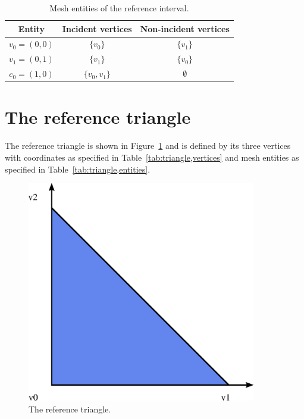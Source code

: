 \begin{table}[H]
\linespread{1.2}\selectfont
  \begin{center}
    \begin{tabular}{|c|c|c|}
      \hline
      Entity & Incident vertices & Non-incident vertices \\
      \hline
      \hline
      $v_0 = (0, 0)$ & $\{v_0\}$ & $\{v_1\}$ \\
      \hline
      $v_1 = (0, 1)$ & $\{v_1\}$ & $\{v_0\}$ \\
      \hline
      $c_0 = (1, 0)$ & $\{v_0, v_1\}$ & $\emptyset$ \\
      \hline
    \end{tabular}
    \caption{Mesh entities of the reference interval.}
    \label{tab:interval,entities}
  \end{center}
\end{table}

\newpage
\section{The reference triangle}

The reference triangle is shown in Figure~\ref{fig:triangle} and is
defined by its three vertices with coordinates as specified in
Table~\ref{tab:triangle,vertices} and mesh entities as specified in
Table~\ref{tab:triangle,entities}.

\begin{figure}[H]
  \begin{center}
    \includegraphics[width=10cm]{eps/triangle.eps}
    \caption{The reference triangle.}
    \label{fig:triangle}
  \end{center}
\end{figure}

